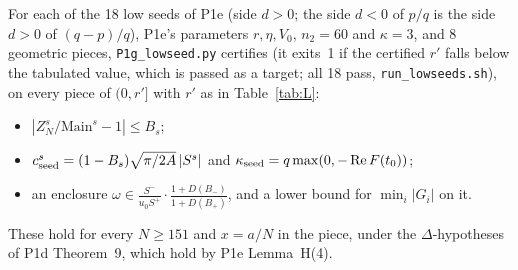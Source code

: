 \documentclass[11pt]{article}
\theoremstyle{definition}\newtheorem{definition}[theorem]{Definition}
\theoremstyle{remark}\newtheorem{remark}[theorem]{Remark}
\begin{document}
\begin{proposition}\label{prop:L}
For each of the 18 low seeds of P1e (side $d>0$; the side $d<0$ of $p/q$ is the side $d>0$ of $(q-p)/q$), P1e's parameters $r,\eta,V_0$, $n_2=60$ and $\kappa=3$, and 8 geometric pieces, \texttt{P1g\_lowseed.py} certifies (it exits~1 if the certified $r'$ falls below the tabulated value, which is passed as a target; all 18 pass, \texttt{run\_lowseeds.sh}), on every piece of $(0,r']$ with $r'$ as in Table~\ref{tab:L}:
\begin{itemize}
\item $|Z^s_N/\mathrm{Main}^s-1|\le B_s$;
\item $c^s_{\rm seed}=(1-B_s)\sqrt{\pi/2A}\,|S^s|$ and $\kappa_{\rm seed}=q\max(0,-\operatorname{Re}F(t_0))$;
\item an enclosure $\omega\in\frac{S^-}{u_0S^+}\cdot\frac{1+D(B_-)}{1+D(B_+)}$, and a lower bound for $\min_i|G_i|$ on it.
\end{itemize}
These hold for every $N\ge151$ and $x=a/N$ in the piece, under the $\Delta$-hypotheses of P1d Theorem~9, which hold by P1e Lemma~H(4).
\end{proposition}
\end{document}
